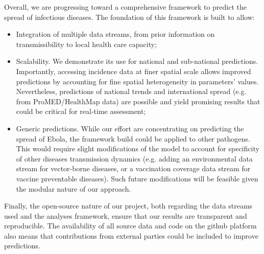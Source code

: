 \documentclass[11pt,]{article}
\begin{document}
Overall, we are progressing toward a comprehensive framework to predict the
spread of infectious diseases. The foundation of this framework is built to
allow:
\begin{itemize}
\item Integration of multiple data streams, from prior information on 
 transmissibility to local health care capacity;
\item Scalability. We demonstrate its use for national and sub-national 
  predictions. Importantly, accessing incidence data at finer spatial scale allows
   improved predictions by accounting for fine spatial heterogeneity in parameters' values. 
   Nevertheless, predictions of national trends and international spread (e.g. from 
   ProMED/HealthMap data) are possible and yield promising results that could be 
   critical for real-time assessment;
\item Generic predictions. While our effort are concentrating on predicting the spread of Ebola,
  the framework build could be applied to other pathogens. This would require slight modifications
  of the model to account for specificity of other diseases transmission dynamics (e.g. adding an 
  environmental data stream for vector-borne diseases, or a vaccination coverage data stream for
  vaccine preventable diseases). Such future modifications will be feasible given the modular nature
  of our approach.

\end{itemize}

Finally, the open-source nature of our project,  both regarding the data streams 
  used and the analyses framework, ensure that our results are transparent and 
  reproducible. The availability of all source data and code on the github platform also means
  that contributions from external parties could be included to improve predictions.

\newpage


\end{document}
